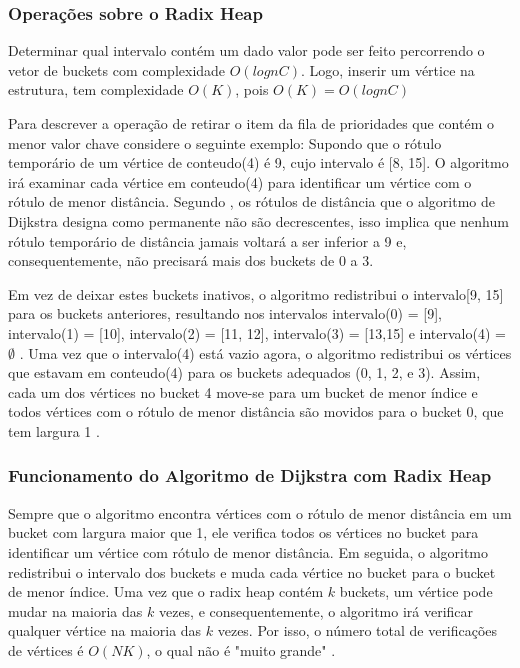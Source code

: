 \subsubsection{Operações sobre o Radix Heap}
Determinar qual intervalo contém um dado valor pode ser feito percorrendo o vetor de buckets com complexidade $O(lognC)$.
Logo, inserir um vértice na estrutura, tem complexidade $O(K)$, pois $O(K) = O(lognC)$

Para descrever a operação de retirar o item da fila de prioridades que contém o menor valor chave considere o seguinte exemplo:
Supondo que o rótulo temporário de um vértice de conteudo(4) é 9, cujo intervalo é [8, 15].
O algoritmo irá examinar cada vértice em conteudo(4) para identificar um vértice com o rótulo de menor distância.
Segundo \cite{bookahuja}, os rótulos de distância que o algoritmo de Dijkstra designa como permanente não são decrescentes,
isso implica que nenhum rótulo temporário de distância jamais voltará
a ser inferior a 9 e, consequentemente, não precisará mais dos buckets de 0 a 3.

Em vez de deixar estes buckets inativos, o algoritmo redistribui o intervalo[9, 15]
para os buckets anteriores, resultando nos intervalos intervalo(0) = [9], intervalo(1) = [10],
intervalo(2) = [11, 12], intervalo(3) = [13,15] e intervalo(4) = $\emptyset$ . Uma vez que o intervalo(4)
está vazio agora, o algoritmo redistribui os vértices que estavam em conteudo(4) para os buckets adequados (0, 1, 2, e 3).
Assim, cada um dos vértices no bucket 4 move-se para um bucket de menor índice e todos vértices com o rótulo de menor distância
são movidos para o bucket 0, que tem largura 1 \cite{bookahuja}.

\subsubsection{Funcionamento do Algoritmo de Dijkstra com Radix Heap}
Sempre que o algoritmo encontra vértices com o rótulo de menor distância em um bucket com
largura maior que 1, ele verifica todos os vértices no bucket para identificar um vértice com rótulo de menor distância.
Em seguida, o algoritmo redistribui o intervalo dos buckets e muda cada vértice no bucket para o bucket de menor índice.
Uma vez que o radix heap contém $k$ buckets, um vértice pode mudar na maioria das $k$ vezes, e consequentemente,
o algoritmo irá verificar qualquer vértice na maioria das $k$ vezes. Por isso, o número total de verificações
de vértices é $O(NK)$, o qual não é "muito grande" \cite{bookahuja}.

